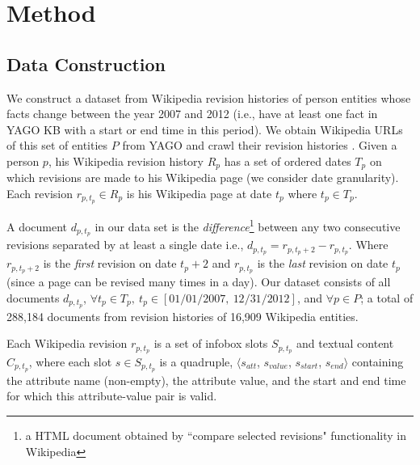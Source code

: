 \section{Method} \label{sec:method}

\subsection{Data Construction} \label{sec:data}
We construct a dataset from Wikipedia revision histories of person entities whose facts change between the year 2007 and 2012 (i.e., have at least one fact in YAGO KB with a start or end time in this period). We obtain Wikipedia URLs of this set of entities $P$ from YAGO and crawl their revision histories%
. Given a person $p$, his Wikipedia revision history $R_p$ has a set of ordered dates $T_p$ on which revisions are made to his Wikipedia page (we consider date granularity). Each revision $r_{p, t_p} \in R_p$ is his Wikipedia page at date $t_p$ where $t_p \in T_p$. 

A document $d_{p, t_p}$ in our data set is the \textit{difference}\footnote[2]{a HTML document obtained by ``compare selected revisions"  functionality in Wikipedia} between any two consecutive revisions separated by at least a single date i.e., $d_{p, t_p} = r_{p, t_p+2} - r_{p, t_p}$. Where $r_{p, t_p+2}$ is the \textit{first} revision on date $t_p+2$ and $r_{p, {t_p}}$ is the \textit{last} revision on date $t_p$ (since a page can be revised many times in a day). Our dataset consists of all documents $d_{p, t_p}$, $\forall t_p \in T_p,\ t_p \in [01/01/2007,\ 12/31/2012]$, and $\forall p \in P$; a total of 288,184 documents from revision histories of 16,909 Wikipedia entities.


Each Wikipedia revision $r_{p, t_p}$ is a set of infobox slots $S_{p, t_p}$ and textual content $C_{p, t_p}$, where each slot $s \in S_{p, t_p}$ is a quadruple, $\langle s_{att}$, $s_{value}$,  $s_{start}$, $s_{end} \rangle$ containing the attribute name (non-empty), the attribute value, and the start and end time for which this attribute-value pair is valid. 

